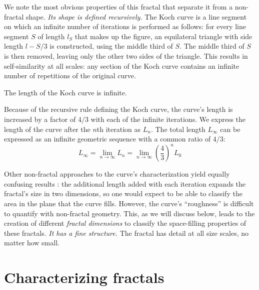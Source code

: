We note the most obvious properties of this fractal that separate it from a non-fractal shape. 
\textit{Its shape is defined recursively.} The Koch curve is a line segment on which an infinite number of iterations is performed as follows: for every line segment $ S $ of length $ l_S $ that makes up the figure, an equilateral triangle with side length $l-S/3$ is constructed, using the middle third of $ S $. The middle third of $S$ is then removed, leaving only the other two sides of the triangle. This results in self-similarity at all scales: any section of the Koch curve contains an infinite number of repetitions of the original curve. 

\begin{myproposition} The length of the Koch curve is infinite. \end{myproposition}
\begin{myproof}
Because of the recursive rule defining the Koch curve, the curve's length is increased by a factor of $ 4/3 $ with each of the infinite iterations. We express the length of the curve after the $n$th iteration as $L_n$. The total length $L_\infty$ can be expressed as an infinite geometric sequence with a common ratio of $ 4/3 $:
\begin{equation}
	L_\infty = \lim_{n \to \infty}L_n = \lim_{n \to \infty}\left(\frac{4}{3}\right)^n L_0
\end{equation}


\end{myproof}

Other non-fractal approaches to the curve's characterization yield equally confusing results : the additional length added with each iteration expands the fractal's size in two dimensions, so one would expect to be able to classify the area in the plane that the curve fills. However, the curve's ``roughness'' is difficult to quantify with non-fractal geometry. This, as we will discuss below, leads to the creation of different \textit{fractal dimensions} to classify the space-filling properties of these fractals. 
\textit{It has a fine structure.}  The fractal has detail at all size scales, no matter how small\citep{fractaltextbook}. 


\section{Characterizing fractals}

